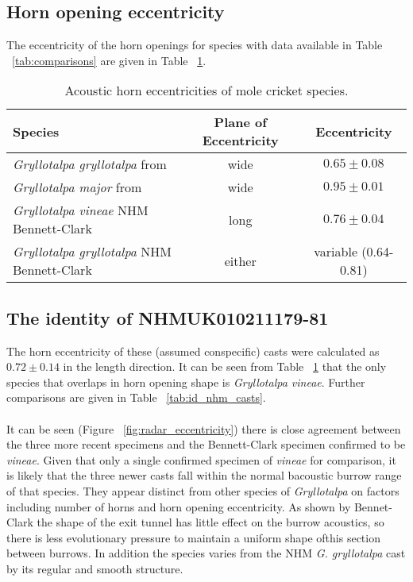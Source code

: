 \documentclass{article}
\begin{document}
   \subsection{Horn opening eccentricity}
   The eccentricity of the horn openings for species with data available in Table ~\ref{tab:comparisons} are given in Table ~\ref{tab:horn_eccentricity}.
   \begin{table}[h]
   \begin{tabular}{|l|c|c|}
   	\hline 	Species &
		   	Plane of Eccentricity &
		   	Eccentricity \\ 
   	\hline  \textit{Gryllotalpa gryllotalpa} from \cite{jafari2015} &
		   	wide &
		   	$0.65\pm0.08$  \\
	\hline	\textit{Gryllotalpa major} from \cite{walker1990} &
			wide &
			$0.95\pm0.01$ \\
	\hline \textit{Gryllotalpa vineae} NHM Bennett-Clark &
			long &
			$0.76\pm0.04$ \\
	\hline	\textit{Gryllotalpa gryllotalpa} NHM Bennett-Clark &
			either &
			variable (0.64-0.81) \\
	
   	\hline 
   \end{tabular}
   \caption{Acoustic horn eccentricities of mole cricket species.}
   \label{tab:horn_eccentricity}
   \end{table} 
   
   \subsection{The identity of NHMUK010211179-81}
   The horn eccentricity of these (assumed conspecific) casts were calculated as $0.72\pm0.14$ in the length direction. It can be seen from Table ~\ref{tab:horn_eccentricity} that the only species that overlaps in horn opening shape is \textit{Gryllotalpa vineae}. Further comparisons are given in Table ~\ref{tab:id_nhm_casts}.
   
   \paragraph{}
   It can be seen (Figure ~\ref{fig:radar_eccentricity})  there is close agreement between the three more recent specimens and the Bennett-Clark specimen confirmed to be \textit{vineae}. Given that only a single confirmed specimen of \textit{vineae} for comparison, it is likely that the three newer casts fall within the normal bacoustic burrow range of that species. They appear distinct from other species of \textit{Gryllotalpa} on factors including number of horns and horn opening eccentricity. As shown by Bennet-Clark the shape of the exit tunnel has little effect on the burrow acoustics, so there is less evolutionary pressure to maintain a uniform shape ofthis section between burrows. In addition the species varies from the NHM \textit{G. gryllotalpa} cast by its regular and smooth structure.
   
\end{document}
